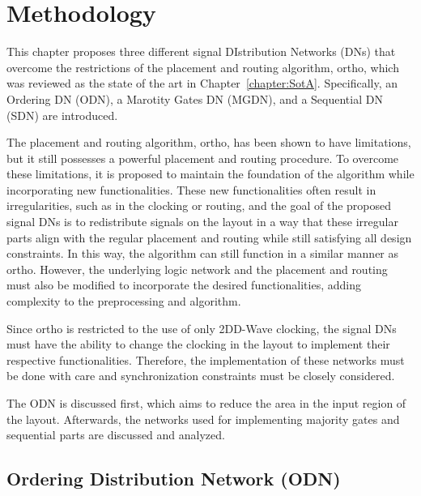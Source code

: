 \chapter{Methodology}\label{chapter:Methodology}
This chapter proposes three different signal DIstribution Networks (DNs) that overcome the restrictions of the placement and routing algorithm, ortho, which was reviewed as the state of the art in Chapter~\ref{chapter:SotA}. Specifically, an Ordering DN (ODN), a Marotity Gates DN (MGDN), and a Sequential DN (SDN) are introduced.

The placement and routing algorithm, ortho, has been shown to have limitations, but it still possesses a powerful placement and routing procedure. To overcome these limitations, it is proposed to maintain the foundation of the algorithm while incorporating new functionalities. These new functionalities often result in irregularities, such as in the clocking or routing, and the goal of the proposed signal DNs is to redistribute signals on the layout in a way that these irregular parts align with the regular placement and routing while still satisfying all design constraints. In this way, the algorithm can still function in a similar manner as ortho. However, the underlying logic network and the placement and routing must also be modified to incorporate the desired functionalities, adding complexity to the preprocessing and algorithm.

Since ortho is restricted to the use of only 2DD-Wave clocking, the signal DNs must have the ability to change the clocking in the layout to implement their respective functionalities. Therefore, the implementation of these networks must be done with care and synchronization constraints must be closely considered.

The ODN is discussed first, which aims to reduce the area in the input region of the layout. Afterwards, the networks used for implementing majority gates and sequential parts are discussed and analyzed.

\section{Ordering Distribution Network (ODN)}

